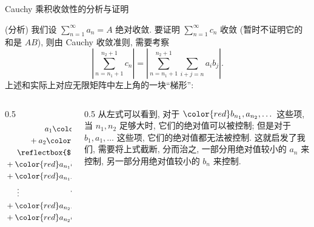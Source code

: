 \begin{frame}{Cauchy 乘积收敛性的分析与证明}

\startproof[bg=yellow, fg=red](分析)
我们设 $\sum\limits_{n=1}^\infty a_n = A$ 绝对收敛. 要证明 $\sum\limits_{n=1}^\infty c_n$ 收敛 (暂时不证明它的和是 $AB$), 则由 Cauchy 收敛准则, 需要考察
\[
\left| \sum_{n = n_1+1}^{n_2+1} c_n \right| = \left| \sum_{n = n_1+1}^{n_2+1} \sum_{i+j=n} a_i b_j \right|.
\]
\pause
上述和实际上对应无限矩阵中左上角的一块``梯形'':
\begin{columns}
\begin{column}{0.5\textwidth}
\begin{align*}
& \hspace{5em} a_1 {\color{red} b_{n_1}} + a_1 {\color{red} b_{n_1+1}} + \cdots + a_1 {\color{red} b_{n_2}} \\
& \hspace{3em} + a_2 {\color{red} b_{n_1-1}} + a_2 {\color{red} b_{n_1}} + \cdots + a_2 {\color{red} b_{n_2-1}} \\
& \hspace{1.5em} \reflectbox{$\ddots$} \hspace{11.5em} \reflectbox{$\ddots$} \\
& + {\color{red} a_{n_1}} b_1 + {\color{red} a_{n_1}} b_2 + \cdots + {\color{red} a_{n_1}} {\color{red} b_{n_2 - n_1 + 1}} \\
& + {\color{red} a_{n_1+1}} {\color{red} b_1} + \cdots + {\color{red} a_{n_1+1}} {\color{red} b_{n_2 - n_1}} \\
& \hspace{1.5em} \vdots \hspace{6.5em} \reflectbox{$\ddots$} \\
& + {\color{red} a_{n_2-1}} b_1 + {\color{red} a_{n_2-1}} b_2 \\
& + {\color{red} a_{n_2}} b_1
\end{align*}
\end{column}
\pause
\begin{column}{0.5\textwidth}
从左式可以看到, 对于 $\color{red} b_{n_1}, a_{n_2}, \dots$ 这些项, 当 $n_1, n_2$ 足够大时, 它们的绝对值可以被控制; 但是对于 $b_1, a_1, \dots$ 这些项, 它们的绝对值都无法被控制. 这就启发了我们, 需要将上式截断, 分而治之, 一部分用绝对值较小的 $a_n$ 来控制, 另一部分用绝对值较小的 $b_n$ 来控制.
\end{column}
\end{columns}

\end{frame}

